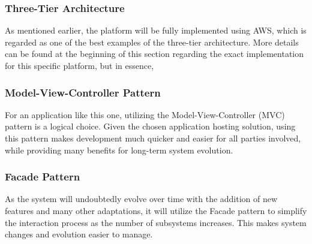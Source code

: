 \subsubsection{Three-Tier Architecture}
As mentioned earlier, the platform will be fully implemented using AWS, which is regarded as one of the best examples of the three-tier architecture. More details can be found at the beginning of this section regarding the exact implementation for this specific platform, but in essence,

\subsubsection{Model-View-Controller Pattern}
For an application like this one, utilizing the Model-View-Controller (MVC) pattern is a logical choice. Given the chosen application hosting solution, using this pattern makes development much quicker and easier for all parties involved, while providing many benefits for long-term system evolution.

\subsubsection{Facade Pattern}
As the system will undoubtedly evolve over time with the addition of new features and many other adaptations, it will utilize the Facade pattern to simplify the interaction process as the number of subsystems increases. This makes system changes and evolution easier to manage.